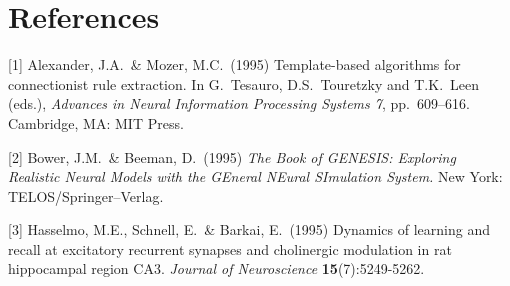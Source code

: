 \documentclass{article}
\begin{document}
\section*{References}

\medskip

{
\small


[1] Alexander, J.A.\ \& Mozer, M.C.\ (1995) Template-based algorithms for
connectionist rule extraction. In G.\ Tesauro, D.S.\ Touretzky and T.K.\ Leen
(eds.), {\it Advances in Neural Information Processing Systems 7},
pp.\ 609--616. Cambridge, MA: MIT Press.


[2] Bower, J.M.\ \& Beeman, D.\ (1995) {\it The Book of GENESIS: Exploring
  Realistic Neural Models with the GEneral NEural SImulation System.}  New York:
TELOS/Springer--Verlag.


[3] Hasselmo, M.E., Schnell, E.\ \& Barkai, E.\ (1995) Dynamics of learning and
recall at excitatory recurrent synapses and cholinergic modulation in rat
hippocampal region CA3. {\it Journal of Neuroscience} {\bf 15}(7):5249-5262.
}
\end{document}
